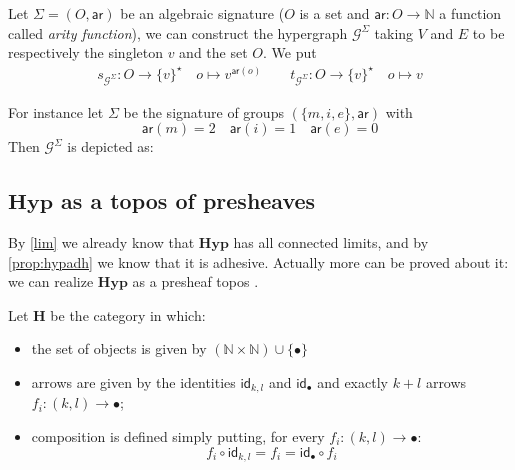 \documentclass[a4paper,UKenglish,cleveref,pdftex,thm-restate,numberwithinsect]{lipics-v2021}
\newcommand{\cat}[1]{\ensuremath{\mathbf{#1}}}
\newcommand{\id}[1]{\mathsf{id}_{#1}}
\newcommand{\hyp}{\cat{Hyp}}
\newcommand{\ari}[0]{\mathsf{ar}}
\begin{document}
\begin{example}\label{exa_3} Let $\Sigma=(O, \ari)$ be an algebraic signature ($O$ is a set and $\ari:O\rightarrow \mathbb{N}$ a function called \emph{arity function}), we can construct the hypergraph $\mathcal{G}^\Sigma$ taking $V$ and $E$ to be respectively the singleton ${v}$ and the set $O$. We put
	\begin{align*}
		s_{\mathcal{G}^\Sigma}:O\to \{v\}^\star \quad o\mapsto v^{\ari(o)}
		\qquad 
		t_{\mathcal{G}^\Sigma}:O\to \{v\}^\star \quad o\mapsto v
	\end{align*}
	
	For instance let $\Sigma$ be the signature of groups $(\{m, i, e \}, \ari)$ with
	\[\ari(m)=2 \quad \ari(i)=1 \quad \ari(e)=0\]	
	Then $\mathcal{G}^\Sigma$ is depicted as:
	\begin{center}
	\end{center}
\end{example}


\subsection{$\hyp$ as a topos of presheaves}
By \cref{lim} we already know that $\hyp$ has all connected limits, and by \cref{prop:hypadh} we know that it is adhesive. Actually more can be proved about it: we can realize $\hyp$ as a presheaf topos \cite{bonchi2022string}.

\begin{definition}Let $\cat{H}$ be the category in which:
	\begin{itemize}
		\item the set of objects is given by $ (\mathbb{N}\times \mathbb{N}) \cup \{\bullet\}$
		\item arrows are given by the identities $\id{k,l}$ and $\id{\bullet}$ and exactly $k+l$ arrows $f_i:(k,l)\rightarrow \bullet$;
		\item composition is defined simply putting, for every $f_i:(k,l)\rightarrow \bullet$:
		\begin{equation*}
			f_i\circ \id{k,l}=f_i = \id{\bullet}\circ f_i 
		\end{equation*}
	\end{itemize}
	
\end{definition}
\end{document}
